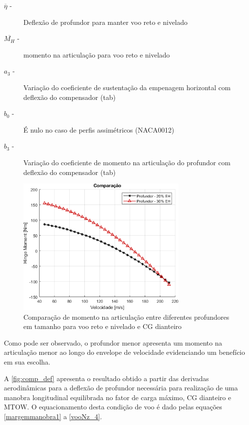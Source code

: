 \begin{description}
\item[$\overline{\eta}$ -] Deflexão de profundor para manter voo reto e nivelado
\item[$\overline{M_H}$ -] momento na articulação para voo reto e nivelado
\item[$a_3$ -] Variação do coeficiente de sustentação da empenagem horizontal com deflexão do compensador (tab)
\item[$b_0$ -] É nulo no caso de perfis assimétricos (NACA0012)
\item[$b_3$ -] Variação do coeficiente de momento na articulação do profundor com deflexão do compensador (tab)
\end{description}

\begin{figure}[H]
\centering
\includegraphics[width=0.75\textwidth]{images/parte3/comparacao_hingemoment.png}
\caption[Comparação de momento na articulação entre diferentes profundores em tamanho]{Comparação de momento na articulação entre diferentes profundores em tamanho para voo reto e nivelado e CG dianteiro}
\label{fig:comp_hingemoment}
\end{figure}

Como pode ser observado, o profundor menor apresenta um momento na articulação menor ao longo do envelope de velocidade evidenciando um benefício em sua escolha.

A \autoref{fig:comp_def} apresenta o resultado obtido a partir das derivadas aerodinâmicas para a deflexão de profundor necessária para realização de uma manobra longitudinal equilibrada no fator de carga máximo, CG dianteiro e MTOW. O equacionamento desta condição de voo é dado pelas equações \ref{margemmanobra1} a \ref{vooNz_4}.

